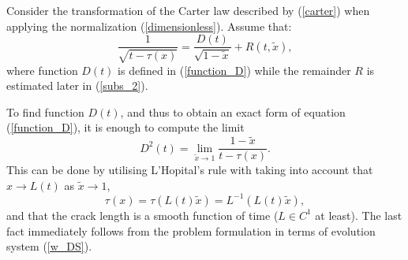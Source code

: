 
Consider the transformation of the Carter law described by (\ref{carter}) when applying the normalization (\ref{dimensionless}). Assume that:
\begin{equation}
\label{f_D}
\frac{1}{\sqrt{t-\tau(x)}}=\frac{D(t)}{\sqrt{1-\tilde x}}+R(t,\tilde x),
\end{equation}
where function $D(t)$ is defined in (\ref{function_D}) while the remainder $R$ is estimated
later in (\ref{subs_2}).

To find function $D(t)$, and thus to obtain an exact form of equation (\ref{function_D}),
it is enough to compute the limit
\begin{equation}
D^2(t)=\lim_{\tilde{x}\rightarrow1}\frac{1-\tilde{x}}{t-\tau(x)}.
\label{d_t_intro}
\end{equation}
This can be done by utilising L'Hopital's rule with taking into account that $x\to L(t)$ as $\tilde{x}\rightarrow1$,
\begin{equation}
\tau(x)=\tau\left(L(t)\tilde{x}\right)=L^{-1}(L(t)\tilde{x})\label{tau_2},
\end{equation}
and that the crack length is a smooth function of time ($L\in C^1$ at least). The last fact immediately follows from the problem formulation in terms of evolution system (\ref{w_DS}).

